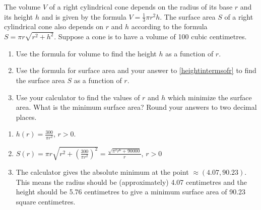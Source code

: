 {The volume $V$ of a right cylindrical cone depends on the radius of its base $r$ and its height $h$ and is given by the formula $V = \frac{1}{3} \pi r^2 h$.  The surface area $S$ of a right cylindrical cone also depends on $r$ and $h$ according to the formula $S = \pi r \sqrt{r^2+h^2}$.  Suppose a cone is to have a volume of 100 cubic centimetres. 

\begin{enumerate}

\item  \label{heightintermsofr} Use the formula for volume to find the height $h$ as a function of $r$.
\item  Use the formula for surface area and your answer to \ref{heightintermsofr} to find the surface area $S$ as a function of $r$.
\item  Use your calculator to find the values of $r$ and $h$ which minimize the surface area.  What is the minimum surface area?  Round your answers to two decimal places.

\end{enumerate}}
{\begin{enumerate}
\item  $h(r) = \frac{300}{\pi r^2}$, $r > 0$.
\item  $S(r) = \pi r \sqrt{r^2+\left(\frac{300}{\pi r^2}\right)^2} = \frac{\sqrt{\pi^2 r^6+90000}}{r}$, $r>0$
\item  The calculator gives the absolute minimum at the point $\approx (4.07, 90.23)$.  This means the radius should be (approximately) 4.07 centimetres and the height should be 5.76 centimetres to give a minimum surface area of 90.23 square centimetres.


\end{enumerate}}